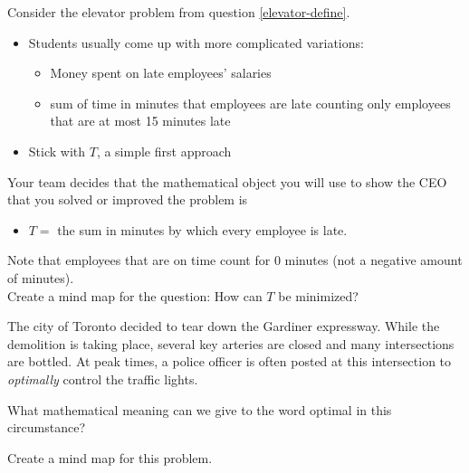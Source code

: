 

\question
\label{elevatorR}
Consider the elevator problem from question \ref{elevator-define}.


\begin{annotation}
	\begin{notes}
	\begin{itemize}
		\item Students usually come up with more complicated variations:
		\begin{itemize}
			\item Money spent on late employees' salaries
			\item sum of time in minutes that employees are late counting only employees that are at most 15 minutes late
		\end{itemize}
		\item Stick with $T$, a simple first approach
	\end{itemize}	
	\end{notes}
	
\end{annotation}

Your team decides that the mathematical object you will use to show the CEO that you solved or improved the problem is
\begin{itemize}
	\item $T=$ the sum in minutes by which every employee is late.
\end{itemize}

Note that employees that are on time count for 0 minutes (not a negative amount of minutes). \\

Create a mind map for the question: \quad How can $T$ be minimized?


\bookonlynewpage


\question

The city of Toronto decided to tear down the Gardiner expressway. While the demolition is taking place, several key arteries are closed and many intersections are bottled. 
At peak times, a police officer is often posted at this intersection to \emph{optimally} control the traffic lights. 

\begin{parts}
	\item What mathematical meaning can we give to the word optimal in this circumstance? 
	\item Create a mind map for this problem.
\end{parts}




